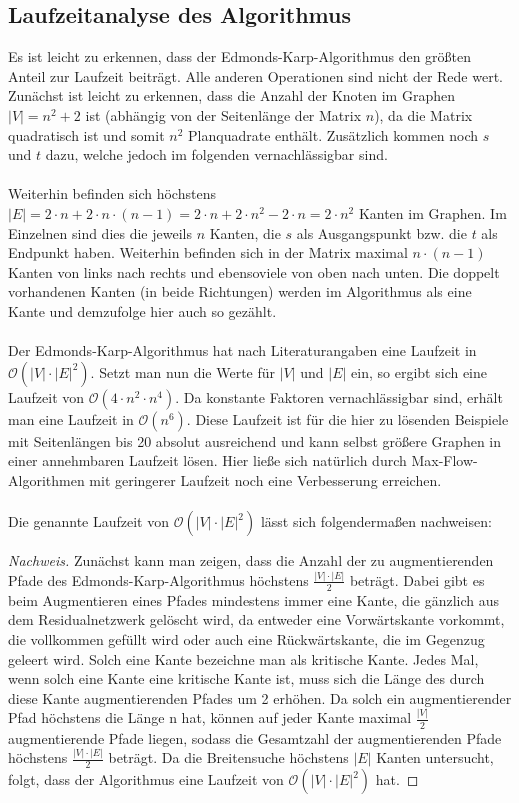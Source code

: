 \documentclass[a4paper, notitlepage, 12pt]{scrartcl}
\begin{document}
 \subsection{Laufzeitanalyse des Algorithmus}
Es ist leicht zu erkennen, dass der Edmonds-Karp-Algorithmus den größten Anteil zur Laufzeit beiträgt. Alle anderen Operationen sind nicht der Rede wert. Zunächst ist leicht zu erkennen, dass die Anzahl der Knoten im Graphen $|V| = n^{2} + 2$ ist (abhängig von der Seitenlänge der Matrix $n$), da die Matrix quadratisch ist und somit $n^{2}$ Planquadrate enthält. Zusätzlich kommen noch $s$ und $t$ dazu, welche jedoch im folgenden vernachlässigbar sind. \\ \\
Weiterhin befinden sich höchstens $|E| = 2 \cdot n + 2 \cdot n \cdot (n-1) = 2 \cdot n + 2 \cdot n^{2} - 2 \cdot n = 2 \cdot n^{2} $ Kanten im Graphen. Im Einzelnen sind dies die jeweils $n$ Kanten, die $s$ als Ausgangspunkt bzw. die $t$ als Endpunkt haben. Weiterhin befinden sich in der Matrix maximal $n \cdot (n-1)$ Kanten von links nach rechts und ebensoviele von oben nach unten. Die doppelt vorhandenen Kanten (in beide Richtungen) werden im Algorithmus als eine Kante und demzufolge hier auch so gezählt. \\ \\
Der Edmonds-Karp-Algorithmus hat nach Literaturangaben eine Laufzeit in $\mathcal{O}(|V| \cdot |E|^{2})$. Setzt man nun die Werte für $|V|$ und $|E|$ ein, so ergibt sich eine Laufzeit von $\mathcal{O}(4 \cdot n^2 \cdot n^4)$. Da konstante Faktoren vernachlässigbar sind, erhält man eine Laufzeit in $\mathcal{O}(n^6)$. Diese Laufzeit ist für die hier zu lösenden Beispiele mit Seitenlängen bis 20 absolut ausreichend und kann selbst größere Graphen in einer annehmbaren Laufzeit lösen. Hier ließe sich natürlich durch Max-Flow-Algorithmen mit geringerer Laufzeit noch eine Verbesserung erreichen. \\ \\
Die genannte Laufzeit von $\mathcal{O}(|V| \cdot |E|^{2})$ lässt sich folgendermaßen nachweisen: 
\begin{proof}[Nachweis]
Zunächst kann man zeigen, dass die Anzahl der zu augmentierenden Pfade des Edmonds-Karp-Algorithmus höchstens $\frac{|V| \cdot |E|}{2}$ beträgt. Dabei gibt es beim Augmentieren eines Pfades mindestens immer eine Kante, die gänzlich aus dem Residualnetzwerk gelöscht wird, da entweder eine Vorwärtskante vorkommt, die vollkommen gefüllt wird oder auch eine Rückwärtskante, die im Gegenzug geleert wird. Solch eine Kante bezeichne man als kritische Kante. Jedes Mal, wenn solch eine Kante eine kritische Kante ist, muss sich die Länge des durch diese Kante augmentierenden Pfades um 2 erhöhen. Da solch ein augmentierender Pfad höchstens die Länge n hat, können auf jeder Kante maximal $\frac{|V|}{2}$ augmentierende Pfade liegen, sodass die Gesamtzahl der augmentierenden Pfade höchstens $\frac{|V| \cdot |E|}{2}$ beträgt. Da die Breitensuche höchstens $|E|$ Kanten untersucht, folgt, dass der Algorithmus eine Laufzeit von $\mathcal{O}(|V| \cdot |E|^{2})$ hat.
\end{proof}
\end{document}

